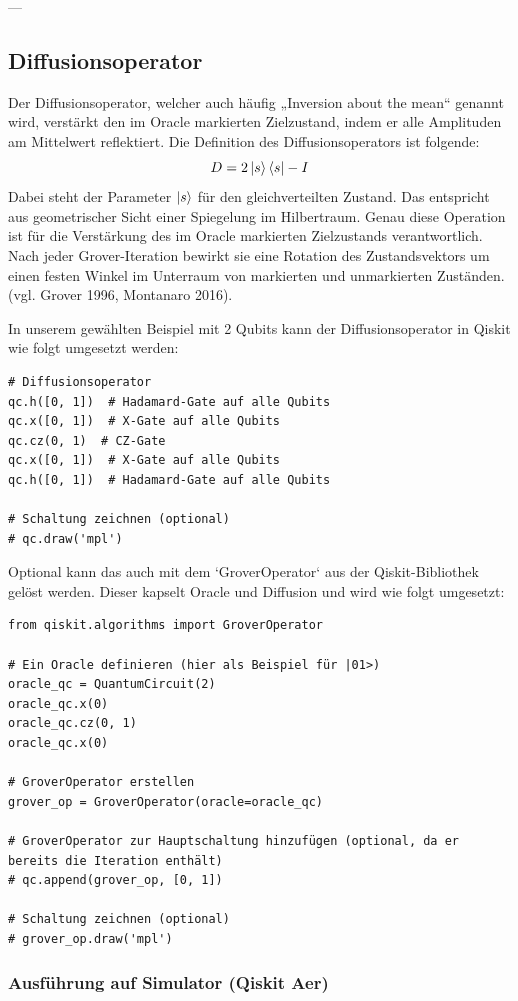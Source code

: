 ---

\subsection*{Diffusionsoperator}
Der Diffusionsoperator, welcher auch häufig „Inversion about the mean“ genannt wird, verstärkt den im Oracle markierten Zielzustand, indem er alle Amplituden am Mittelwert reflektiert. Die Definition des Diffusionsoperators ist folgende:
$$
D = 2\ket{s}\bra{s} - I
$$
Dabei steht der Parameter $\ket{s}$ für den gleichverteilten Zustand. Das entspricht aus geometrischer Sicht einer Spiegelung im Hilbertraum. Genau diese Operation ist für die Verstärkung des im Oracle markierten Zielzustands verantwortlich. Nach jeder Grover-Iteration bewirkt sie eine Rotation des Zustandsvektors um einen festen Winkel im Unterraum von markierten und unmarkierten Zuständen. (vgl. Grover 1996, Montanaro 2016).

In unserem gewählten Beispiel mit 2 Qubits kann der Diffusionsoperator in Qiskit wie folgt umgesetzt werden:
\begin{verbatim}
# Diffusionsoperator
qc.h([0, 1])  # Hadamard-Gate auf alle Qubits
qc.x([0, 1])  # X-Gate auf alle Qubits
qc.cz(0, 1)  # CZ-Gate
qc.x([0, 1])  # X-Gate auf alle Qubits
qc.h([0, 1])  # Hadamard-Gate auf alle Qubits

# Schaltung zeichnen (optional)
# qc.draw('mpl')
\end{verbatim}

Optional kann das auch mit dem `GroverOperator` aus der Qiskit-Bibliothek gelöst werden. Dieser kapselt Oracle und Diffusion und wird wie folgt umgesetzt:
\begin{verbatim}
from qiskit.algorithms import GroverOperator

# Ein Oracle definieren (hier als Beispiel für |01>)
oracle_qc = QuantumCircuit(2)
oracle_qc.x(0)
oracle_qc.cz(0, 1)
oracle_qc.x(0)

# GroverOperator erstellen
grover_op = GroverOperator(oracle=oracle_qc)

# GroverOperator zur Hauptschaltung hinzufügen (optional, da er bereits die Iteration enthält)
# qc.append(grover_op, [0, 1])

# Schaltung zeichnen (optional)
# grover_op.draw('mpl')
\end{verbatim}

\subsubsection{Ausführung auf Simulator (Qiskit Aer)}
